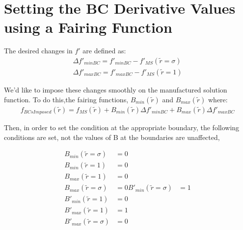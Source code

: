 \section{Setting the BC Derivative Values using a Fairing Function}

The desired changes in $f'$ are defined as:
\begin{align*}
    \Delta f'_{minBC} = f'_{minBC} - f'_{MS}(\widetilde{r} = \sigma)\\
    \Delta f'_{maxBC} = f'_{maxBC} - f'_{MS}(\widetilde{r} = 1) 
\end{align*}

We'd like to impose these changes smoothly on the manufactured solution function.
To do this,the fairing functions, $B_{min}(\widetilde{r})$ and $B_{max}(\widetilde{r})$
where:
\begin{align*}
    f_{BCsImposed}(\widetilde{r}) = f_{MS}(\widetilde{r}) +
    B_{min}(\widetilde{r}) \Delta f'_{minBC}  +  
    B_{max}(\widetilde{r}) \Delta f'_{maxBC}  
\end{align*}

Then, in order to set the condition at the appropriate boundary,
the following conditions are set, not the values of B at the boundaries are unaffected,

\begin{align*}
    B_{min}(\widetilde{r} = \sigma) &= 0\\
    B_{min}(\widetilde{r} = 1) &= 0 \\
    B_{max}(\widetilde{r} = 1) &= 0 \\
    B_{max}(\widetilde{r} = \sigma) &= 0 
    B'_{min}(\widetilde{r} = \sigma) &= 1\\
    B'_{min}(\widetilde{r} = 1) &= 0 \\
    B'_{max}(\widetilde{r} = 1) &= 1 \\
    B'_{max}(\widetilde{r} = \sigma) &= 0 
\end{align*}
%
%


